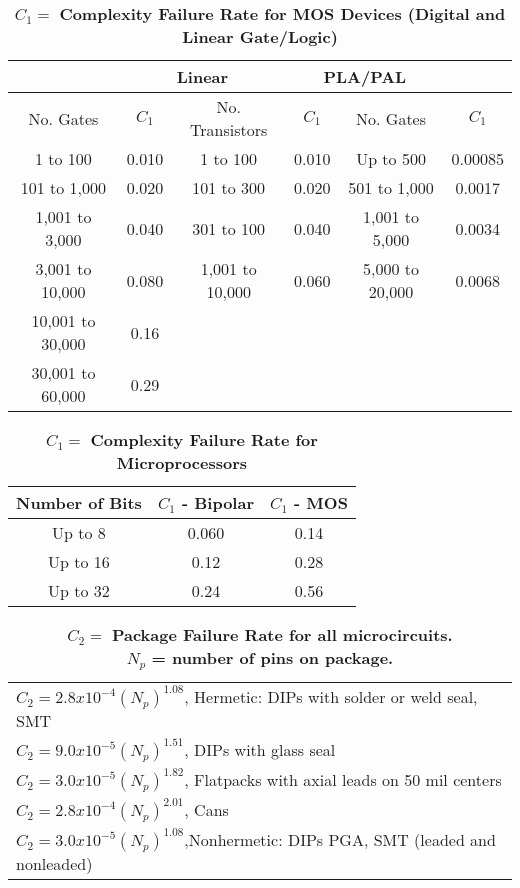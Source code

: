 \begin{table}[h]
\caption{ $C_{1} = $  \textbf{Complexity Failure Rate for MOS Devices (Digital and Linear Gate/Logic)}}
\label{table:complexFailureRateIc}
\begin{tabular}{|c|c|c|c|c|c|} \hline
\rowcolor{Gray}
\multicolumn{2}{|c|}{\textbf{Digital}} & \multicolumn{2}{|c|}{\textbf{Linear}} & \multicolumn{2}{|c|}{\textbf{PLA/PAL}} \\ \hline
\rowcolor{Gray}
No. Gates & $C_{1}$ & No. Transistors &$C_{1}$ & No. Gates & $C_{1}$ \\ \hline
1 to 100 			& 0.010 			& 1 to 100 			& 0.010 		& Up to 500 			& 0.00085 	\\ \hline
101 to 1,000		& 0.020 			& 101 to 300 		& 0.020 		& 501 to 1,000 			& 0.0017 	\\ \hline
1,001 to 3,000		& 0.040			& 301 to 100 		& 0.040 		& 1,001 to 5,000 		& 0.0034 	\\ \hline
3,001 to 10,000 	& 0.080 			& 1,001 to 10,000 	& 0.060 		& 5,000 to 20,000		& 0.0068		\\ \hline
10,001 to 30,000	& 0.16 				& 					&				&			 			&				\\ \hline
30,001 to 60,000	& 0.29 				& 					& 				&						&			\\ \hline
\end{tabular}
\end{table}

\begin{table}[h]
\caption{ $C_{1} = $  \textbf{Complexity Failure Rate for Microprocessors}}
\label{table:complexFailureRateMicro}
\begin{tabular}{|c|c|c|} \hline
\rowcolor{Gray}
\textbf{Number of Bits} & $C_{1}$ \textbf{- Bipolar} & $C_{1}$  \textbf{- MOS} \\ \hline
Up to 8 		& 0.060		&	0.14 		\\ \hline
Up to 16		& 0.12		& 	0.28		\\	\hline
Up to 32 		& 0.24		&	0.56		\\ \hline
\end{tabular}
\end{table}

\begin{table}[h]
\caption{ $C_{2} =$ \textbf{Package Failure Rate for all microcircuits.} \\ $N_{p}$ \textbf{= number of pins on package.}}
\label{table:packageFailRateIc}
\begin{tabular}{|l|} \hline
$C_{2} = 2.8 x 10^{-4} (N_{p})^{1.08}$, Hermetic: DIPs with solder or weld seal, SMT 			\\
$C_{2} = 9.0 x 10^{-5} (N_{p})^{1.51}$, DIPs with glass seal		\\
$C_{2} = 3.0 x 10^{-5} (N_{p})^{1.82}$, Flatpacks with axial leads on 50 mil centers		\\
$C_{2} = 2.8 x 10^{-4} (N_{p})^{2.01}$, Cans			\\
$C_{2} = 3.0 x 10^{-5} (N_{p})^{1.08}$,Nonhermetic: DIPs PGA, SMT (leaded and nonleaded)			\\ \hline
\end{tabular}
\end{table}

